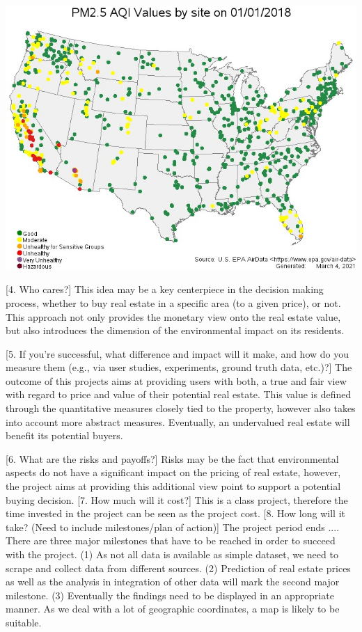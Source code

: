 \documentclass[sigconf,nonacm,11pt]{acmart}
\begin{document}
\includegraphics[scale=0.4]{AQ_US_2018.jpg}

[4. Who cares?]
This idea may be a key centerpiece in the decision making process, whether to buy real estate in a specific area (to a given price), or not. This approach not only provides the monetary view onto the real estate value, but also introduces the dimension of the environmental impact on its residents.

[5. If you're successful, what difference and impact will it make, and how do you measure them (e.g., via user studies, experiments, ground truth data, etc.)?]
The outcome of this projects aims at providing users with both, a true and fair view with regard to price and value of their potential real estate. This value is defined through the quantitative measures closely tied to the property, however also takes into account more abstract measures. Eventually, an undervalued real estate will benefit its potential buyers.


[6. What are the risks and payoffs?]
Risks may be the fact that environmental aspects do not have a significant impact on the pricing of real estate, however, the project aims at providing this additional view point to support a potential buying decision.
[7. How much will it cost?]
This is a class project, therefore the time invested in the project can be seen as the project cost.
[8. How long will it take? (Need to include milestones/plan of action)]
The project period ends ....
There are three major milestones that have to be reached in order to succeed with the project. (1) As not all data is available as simple dataset, we need to scrape and collect data from different sources. (2) Prediction of real estate prices as well as the analysis in integration of other data will mark the second major milestone. (3) Eventually the findings need to be displayed in an appropriate manner. As we deal with a lot of geographic coordinates, a map is likely to be suitable.
\end{document}

